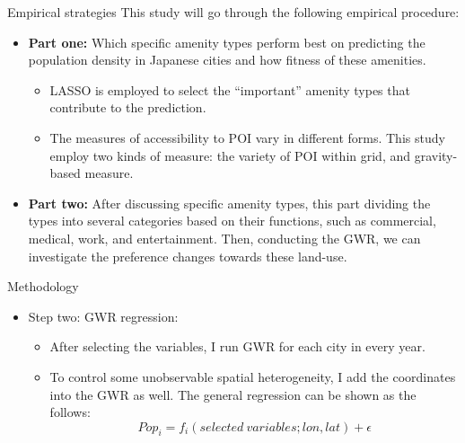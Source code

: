 \documentclass[aspectratio=169,xcolor=dvipsnames]{beamer}
\begin{document}
\begin{frame}{Empirical strategies}
	This study will go through the following empirical procedure:
	\begin{itemize}
	\item \textbf{Part one:} Which specific amenity types perform best on predicting the population density in Japanese cities and how fitness of these amenities.
\begin{itemize}
	\item LASSO is employed to select the ``important'' amenity types that contribute to the prediction.
	\item The measures of accessibility to POI vary in different forms. This study employ two kinds of measure: the variety of POI within grid, and gravity-based measure.
\end{itemize}
\item \textbf{Part two:} After discussing specific amenity types, this part dividing the types into several categories based on their functions, such as commercial, medical, work, and entertainment. Then, conducting the GWR, we can investigate the preference changes towards these land-use.
	\end{itemize}
\end{frame}
\begin{frame}{Methodology}
	\begin{itemize}
	\item Step two: GWR regression:
\begin{itemize}
	\item After selecting the variables, I run GWR for each city in every year.
	\item To control some unobservable spatial heterogeneity, I add the coordinates into the GWR as well. The general regression can be shown as the follows:
	\begin{equation}
	Pop_{i}=f_i(selected\ variables; lon, lat)+\epsilon
	\end{equation}
\end{itemize}
	\end{itemize}

\end{frame}
\end{document}
